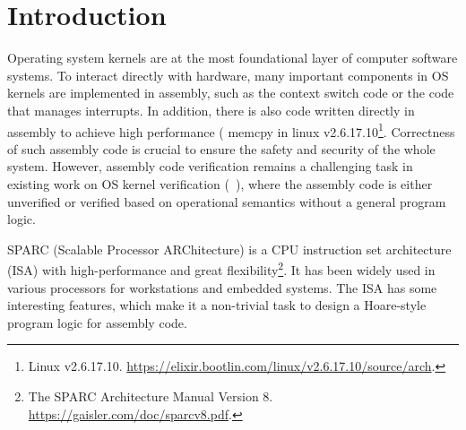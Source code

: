 \section{Introduction}

Operating system kernels are at
the most foundational layer of computer software systems.
To interact directly with hardware,
many important components in OS kernels are implemented
in assembly, such as the context switch code or the code that
manages interrupts.
In addition, there is also code written directly in assembly
to achieve high performance (\eg{} \textsf{memcpy} in linux
v2.6.17.10\footnote{Linux v2.6.17.10. \url{https://elixir.bootlin.com/linux/v2.6.17.10/source/arch}.}.
Correctness of such assembly code is crucial to ensure
the safety and security of the whole system.
However, assembly code verification remains a challenging
task in existing work on OS kernel verification
(\eg~\cite{Xu16cav, sel4, deepspec}),
where the assembly code is either unverified or verified based on
operational semantics without a general program logic.

SPARC (Scalable Processor ARChitecture)
is a CPU instruction set architecture (ISA) with high-performance
and great flexibility\footnote{The SPARC Architecture Manual Version 8. \url{https://gaisler.com/doc/sparcv8.pdf}.}.
It has been widely used in various processors
for workstations and embedded systems. %
The \sparc{} ISA has some interesting features, which
make it a non-trivial task to design a Hoare-style
program logic for assembly code.

